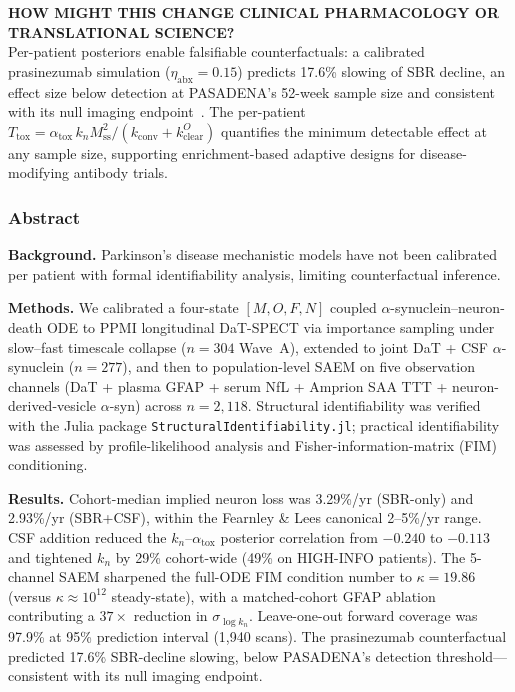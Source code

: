 \begin{studyhighlights}
\vspace{0.3em}\textbf{HOW MIGHT THIS CHANGE CLINICAL PHARMACOLOGY OR TRANSLATIONAL SCIENCE?}\\
Per-patient posteriors enable falsifiable counterfactuals: a calibrated prasinezumab simulation ($\eta_\text{abx} = 0.15$) predicts 17.6\% slowing of SBR decline, an effect size below detection at PASADENA's 52-week sample size and consistent with its null imaging endpoint~\cite{pagano2022}. The per-patient $T_\text{tox} = \alpha_\text{tox}\,k_n M_\text{ss}^2/(k_\text{conv}+k_\text{clear}^O)$ quantifies the minimum detectable effect at any sample size, supporting enrichment-based adaptive designs for disease-modifying antibody trials.
\end{studyhighlights}

\subsubsection*{Abstract}

\noindent\textbf{Background.}
Parkinson's disease mechanistic models have not been calibrated per patient with formal identifiability analysis, limiting counterfactual inference.

\noindent\textbf{Methods.}
We calibrated a four-state $[M,O,F,N]$ coupled $\alpha$-synuclein--neuron-death ODE to PPMI longitudinal DaT-SPECT via importance sampling under slow--fast timescale collapse ($n{=}304$ Wave~A), extended to joint DaT + CSF $\alpha$-synuclein ($n{=}277$), and then to population-level SAEM on five observation channels (DaT + plasma GFAP + serum NfL + Amprion SAA TTT + neuron-derived-vesicle $\alpha$-syn) across $n{=}2{,}118$. Structural identifiability was verified with the Julia package \texttt{Structural\-Identifiability.jl}; practical identifiability was assessed by profile-likelihood analysis and Fisher-information-matrix (FIM) conditioning.

\noindent\textbf{Results.}
Cohort-median implied neuron loss was 3.29\%/yr (SBR-only) and 2.93\%/yr (SBR+CSF), within the Fearnley \& Lees canonical 2--5\%/yr range. CSF addition reduced the $k_n$--$\alpha_\text{tox}$ posterior correlation from $-0.240$ to $-0.113$ and tightened $k_n$ by 29\% cohort-wide (49\% on HIGH-INFO patients). The 5-channel SAEM sharpened the full-ODE FIM condition number to $\kappa = 19.86$ (versus $\kappa \approx 10^{12}$ steady-state), with a matched-cohort GFAP ablation contributing a $37\times$ reduction in $\sigma_{\log k_n}$. Leave-one-out forward coverage was 97.9\% at 95\% prediction interval (1{,}940 scans). The prasinezumab counterfactual predicted 17.6\% SBR-decline slowing, below PASADENA's detection threshold---consistent with its null imaging endpoint.

